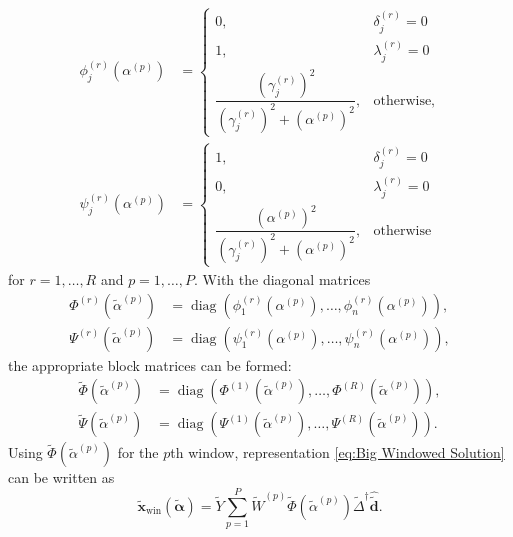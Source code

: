 \documentclass[12pt]{article}
\newcommand{\dVec}{\mathbf{d}}	%
\newcommand{\xVec}{\mathbf{x}}	%
\newcommand{\pinv}[1]{{#1}^\dagger}	%
\DeclareMathOperator{\diag}{diag}	%
\newcommand{\dft}[1]{\widehat{#1}}	%
\newcommand{\regparam}{\alpha}  %
\newcommand{\regparamVec}{\bm{\regparam}}   %
\newcommand{\regparamVecBig}{\widetilde{\regparamVec}}   %
\newcommand{\xBig}{\widetilde{\xVec}}	%
\newcommand{\xWinBig}{\xBig_{\text{win}}}	%
\newcommand{\dBig}{\widetilde{\dVec}}	%
\newcommand{\filt}{\phi}
\newcommand{\mfilt}{\psi}
\begin{document}
\begin{align*}
    \filt_j^{(r)}\left(\regparam^{(p)}\right) &= \begin{cases}
0, & \delta_j^{(r)} = 0 \\
1, & \lambda_j^{(r)} = 0 \\
\dfrac{\left(\gamma_j^{(r)}\right)^2}{\left(\gamma_j^{(r)}\right)^2 + \left(\regparam^{(p)}\right)^2}, & \text{otherwise,}
\end{cases} \\
\mfilt_j^{(r)}\left(\regparam^{(p)}\right) &= \begin{cases}
1, & \delta_j^{(r)} = 0 \\
0, & \lambda_j^{(r)} = 0 \\
\dfrac{\left(\regparam^{(p)}\right)^2}{\left(\gamma_j^{(r)}\right)^2 + \left(\regparam^{(p)}\right)^2}, & \text{otherwise}
\end{cases}
\end{align*}
for $r = 1,\ldots,R$ and $p = 1,\ldots,P$. With the diagonal matrices
\begin{align*}
    \Phi^{(r)}\left(\widetilde{\regparam}^{(p)}\right) &= \diag\left(\filt_1^{(r)}\left(\regparam^{(p)}\right),\ldots,\filt_n^{(r)}\left(\regparam^{(p)}\right)\right), \\ \Psi^{(r)}\left(\widetilde{\regparam}^{(p)}\right) &= \diag\left(\mfilt_1^{(r)}\left(\regparam^{(p)}\right),\ldots,\mfilt_n^{(r)}\left(\regparam^{(p)}\right)\right),
\end{align*}
the appropriate block matrices can be formed:
\begin{align*}
    \widetilde{\Phi}\left(\widetilde{\regparam}^{(p)}\right) &= \diag\left(\Phi^{(1)}\left(\widetilde{\regparam}^{(p)}\right),\ldots,\Phi^{(R)}\left(\widetilde{\regparam}^{(p)}\right)\right), \\ \widetilde{\Psi}\left(\widetilde{\regparam}^{(p)}\right) &= \diag\left(\Psi^{(1)}\left(\widetilde{\regparam}^{(p)}\right),\ldots,\Psi^{(R)}\left(\widetilde{\regparam}^{(p)}\right)\right).
\end{align*}
Using $\widetilde{\Phi}\left(\widetilde{\regparam}^{(p)}\right)$ for the $p$th window, representation \eqref{eq:Big Windowed Solution} can be written as
\begin{equation}
\label{eq:Big Windowed Solution 2}
    \xWinBig(\regparamVecBig) = \widetilde{Y}\sum_{p=1}^{P} \widetilde{W}^{(p)}\widetilde{\Phi}\left(\widetilde{\regparam}^{(p)}\right)\pinv{\widetilde{\Delta}}\dft{\dBig}.
\end{equation}
\end{document}
